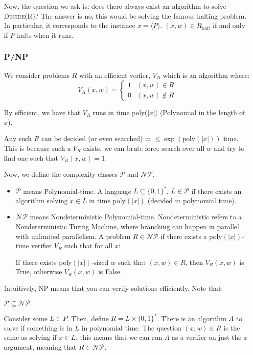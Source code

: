 Now, the question we ask is: does there always exist an algorithm to solve \textsc{Decide(R)}? The answer is no,
this would be solving the famous halting problem. In particular, it corresponds to the instance $x = \langle P \rangle$. $(x, w) \in R_{halt}$ if
and only if $P$ halts when it runs.

\subsubsection{P/NP}
We consider problems $R$ with an efficient verfier, $V_R$ which is an algorithm where:
\[ V_R(x, w) = \begin{cases}
    1 & (x, w) \in R \\
    0 & (x, w) \notin R
\end{cases} \]

By efficient, we have that $V_R$ runs in time poly($|x|$) (Polynomial in the length of $x$).

\begin{note}
    Any such $R$ can be decided (or even searched) in $\leq \exp(\text{poly}(|x|))$ time.
    This is because such a $V_R$ exists, we can brute force search over all $w$ and try to find one
    such that $V_R(x, w) = 1$.
\end{note}

Now, we define the complexity classes $\mathcal{P}$ and $\mathcal{NP}$.

\begin{definition}
    \begin{itemize}
    \item $\mathcal{P}$ means Polynomial-time.
    A language $L \subseteq \{0, 1\}^*$, $L \in \mathcal{P}$ if there exists an algorithm solving $x \in L$ in time poly$(|x|)$ (decided in polynomial time).

    \item $\mathcal{NP}$ means Nondeterministic Polynomial-time. Nondeterministic refers to a Nondeterministic Turing Machine,
    where branching can happen in parallel with unlimited parallelism.
    A problem $R \in \mathcal{NP}$ if there exists a poly$(|x|)$-time verifier $V_R$ such that for all $x$:

    If there exists poly$(|x|)$-sized $w$ such that
    $(x, w) \in R$, then $V_R(x, w)$ is True, otherwise $V_R(x, w)$ is False.
    \end{itemize}
\end{definition}

Intuitively, NP means that you can verify solutions efficiently. Note that:
\begin{theorem}[P in NP]
    $\mathcal{P} \subseteq \mathcal{NP}$

    \begin{proof*}
        Consider some $L \in P$. Then, define $R = L \times \{0, 1\}^*$. There is an algorithm $A$ to solve if something is in $L$ in polynomial time.
        The question $(x, w) \in R$ is the same as solving if $x \in L$, this means that we can run $A$ as a verifier on just the $x$ argument,
        meaning that $R \in \mathcal{NP}$.
    \end{proof*}
\end{theorem}

